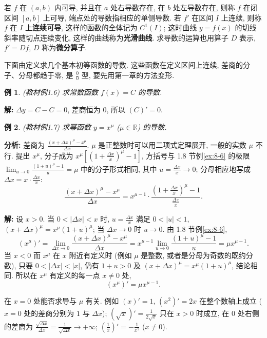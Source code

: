 \documentclass[UTF8,openany]{ctexbook}
\theoremstyle{chinesetextbook}
\newtheorem{example}{例}[section]
\newenvironment{cnsolution}{\par\indent\textbf{解:} \ignorespaces}{\par}
\begin{document}
若 $f$ 在 $(a,b)$ 内可导, 并且在 $a$ 处右导数存在, 在 $b$ 处左导数存在, 则称 $f$ 在闭区间 $[a,b]$ 上可导, 端点处的导数指相应的单侧导数. 若 $f'$ 在区间 $I$ 上连续, 则称 $f$ 在 $I$ 上\textbf{连续可导}, 这样的函数的全体记为 $C^1(I)$; 这时曲线 $y=f(x)$ 的切线斜率随切点连续变化, 这样的曲线称为\textbf{光滑曲线}. 求导数的运算也用算子 $D$ 表示, $f'=Df$, $D$ 称为\textbf{微分算子}.

下面由定义求几个基本初等函数的导数. 这些函数在定义区间上连续, 差商的分子、分母都趋于零, 是 $\displaystyle\frac00$ 型, 要先用第一章的方法变形.
\begin{example}\label{ex:c2-1-6}
\textnormal{(教材例1.6)} 求常数函数 $f(x)=C$ 的导数.
\end{example}
\begin{cnsolution}
$\Delta y=C-C=0$, 差商恒为 $0$, 所以 $(C)'=0$.
\end{cnsolution}
\begin{example}\label{ex:c2-1-7}
\textnormal{(教材例1.7)} 求幂函数 $y=x^\mu$ ($\mu\in\mathbb R$) 的导数.
\end{example}
\par\indent\textbf{分析:} 差商为 $\displaystyle\frac{(x+\Delta x)^\mu-x^\mu}{\Delta x}$. $\mu$ 是正整数时可以用二项式定理展开, 一般的实数 $\mu$ 不行. 提出 $x^\mu$, 分子成为 $\displaystyle x^\mu\left[\left(1+\frac{\Delta x}x\right)^\mu-1\right]$, 方括号与 1.8 节例\ref{ex:8-6} 的极限 $\displaystyle\lim_{u\to0}\frac{(1+u)^\mu-1}u=\mu$ 中的分子形式相同, 其中 $\displaystyle u=\frac{\Delta x}x\to0$; 分母相应地写成 $\displaystyle\Delta x=x\cdot\frac{\Delta x}x$:
\[
\frac{(x+\Delta x)^\mu-x^\mu}{\Delta x}=x^{\mu-1}\cdot\frac{\left(1+\frac{\Delta x}x\right)^\mu-1}{\frac{\Delta x}x}.
\]
\begin{cnsolution}
设 $x>0$. 当 $0<|\Delta x|<x$ 时, $\displaystyle u=\frac{\Delta x}x$ 满足 $0<|u|<1$, $(x+\Delta x)^\mu=x^\mu(1+u)^\mu$; 当 $\Delta x\to0$ 时 $u\to0$. 由 1.8 节例\ref{ex:8-6},
\[
(x^\mu)'=\lim_{\Delta x\to0}\frac{(x+\Delta x)^\mu-x^\mu}{\Delta x}=x^{\mu-1}\lim_{u\to0}\frac{(1+u)^\mu-1}u=\mu x^{\mu-1}.
\]
当 $x<0$ 而 $x^\mu$ 在 $x$ 附近有定义时 (例如 $\mu$ 是整数, 或者是分母为奇数的既约分数), 只要 $0<|\Delta x|<|x|$, 仍有 $1+u>0$ 及 $(x+\Delta x)^\mu=x^\mu(1+u)^\mu$, 结论相同. 所以在 $x^\mu$ 有定义的每一点 $x\ne0$ 处,
\[
(x^\mu)'=\mu x^{\mu-1}.
\]
\end{cnsolution}
在 $x=0$ 处能否求导与 $\mu$ 有关. 例如 $(x)'=1$, $(x^2)'=2x$ 在整个数轴上成立 ($x=0$ 处的差商分别为 $1$ 与 $\Delta x$); $\displaystyle\left(\sqrt x\right)'=\frac1{2\sqrt x}$ 只在 $x>0$ 时成立, 在 $0$ 处右侧的差商为 $\displaystyle\frac{\sqrt{\Delta x}}{\Delta x}=\frac1{\sqrt{\Delta x}}\to+\infty$; $\displaystyle\left(\frac1x\right)'=-\frac1{x^2}$ ($x\ne0$).
\end{document}
